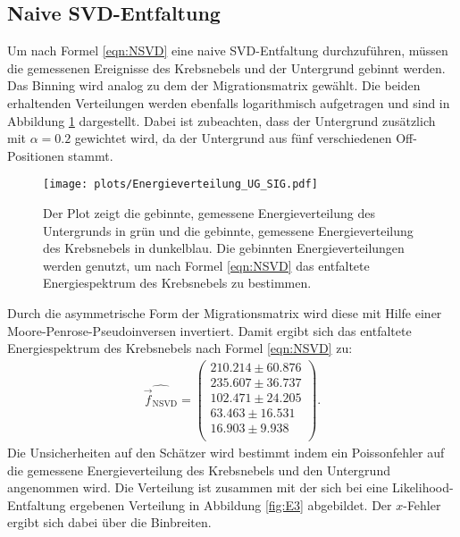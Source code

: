 \subsection{Naive SVD-Entfaltung}
Um nach Formel \eqref{eqn:NSVD} eine naive SVD-Entfaltung durchzuführen, müssen die gemessenen Ereignisse des Krebsnebels und der Untergrund gebinnt werden. Das Binning wird analog zu dem der Migrationsmatrix gewählt. Die beiden erhaltenden Verteilungen werden ebenfalls logarithmisch aufgetragen und sind in Abbildung \ref{fig:UG_Sig} dargestellt. Dabei ist zubeachten, dass der Untergrund zusätzlich mit $\alpha=0.2$ gewichtet wird, da der Untergrund aus fünf verschiedenen Off-Positionen stammt.\\
\begin{figure}
  \centering
  \texttt{[image: plots/Energieverteilung\_UG\_SIG.pdf]}
  \caption{Der Plot zeigt die gebinnte, gemessene Energieverteilung des Untergrunds in grün und die gebinnte, gemessene Energieverteilung des Krebsnebels in dunkelblau. Die gebinnten Energieverteilungen werden genutzt, um nach Formel \eqref{eqn:NSVD} das entfaltete Energiespektrum des Krebsnebels zu bestimmen.}
  \label{fig:UG_Sig}
\end{figure}
Durch die asymmetrische Form der Migrationsmatrix wird diese mit Hilfe einer Moore-Penrose-Pseudoinversen invertiert. Damit ergibt sich das entfaltete Energiespektrum des Krebsnebels nach Formel \eqref{eqn:NSVD} zu:
\begin{align*}
	\hat{\vec{f}_{\text{NSVD}}} = \begin{pmatrix}
			210.214 \pm 60.876\\
			235.607 \pm 36.737\\
			102.471 \pm 24.205\\
			63.463 \pm 16.531\\
			16.903 \pm 9.938\\
	\end{pmatrix}.
\end{align*}
Die Unsicherheiten auf den Schätzer wird bestimmt indem ein Poissonfehler auf die gemessene Energieverteilung des Krebsnebels und den Untergrund angenommen wird. Die Verteilung ist zusammen mit der sich bei eine Likelihood-Entfaltung ergebenen Verteilung in Abbildung \ref{fig:E3} abgebildet. Der $x$-Fehler ergibt sich dabei über die Binbreiten.
